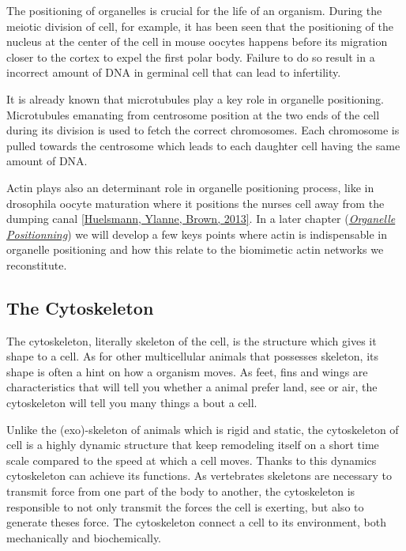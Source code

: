 \documentclass[A4paperpaper,11pt,english]{sphinxmanual}
\begin{document}
The positioning of organelles is crucial for the life of an organism. During the
meiotic division of cell, for example, it has been seen that the positioning of
the nucleus at the center of the cell in mouse oocytes happens before its
migration closer to the cortex to expel the first polar body. Failure to do so
result in a incorrect amount of DNA in germinal cell that can lead to
infertility.

It is already known that microtubules play a key role in organelle positioning.
Microtubules emanating from centrosome position at the two ends of the cell
during its division is used to fetch the correct chromosomes. Each
chromosome is pulled towards the centrosome which leads to each daughter
cell having the same amount of DNA.

Actin plays also an determinant role in organelle positioning process,
like in drosophila oocyte maturation where it positions the nurses cell away
from the dumping canal {\hyperref[parts/part1:huelsmann2013]{{[}Huelsmann, Ylanne, Brown,  2013{]}}}. In a later chapter ({\hyperref[parts/part1:organelle-positioning]{\emph{Organelle
Positionning}}}) we will develop a few keys points where
actin is indispensable in organelle positioning and how this relate to the
biomimetic actin networks we reconstitute.


\subsection{The Cytoskeleton}
\label{parts/part1:intro-cyto}\label{parts/part1:the-cytoskeleton}
The cytoskeleton, literally skeleton of the cell, is the structure which gives
it shape to a cell.  As for other multicellular animals that possesses
skeleton, its shape is often a hint on how a organism moves. As feet, fins and
wings are characteristics that will tell you whether a animal
prefer land, see or air, the cytoskeleton will tell you many
things a bout a cell.

Unlike the (exo)-skeleton of animals which is rigid and
static, the cytoskeleton of cell is a  highly dynamic structure that keep
remodeling itself on a short time scale compared to the speed at which a cell
moves. Thanks to this dynamics cytoskeleton can achieve its
functions.  As vertebrates skeletons are necessary to transmit force from one part
of the body to another, the cytoskeleton is responsible to not only
transmit the forces the cell is exerting, but also to generate theses force.
The cytoskeleton connect a cell to its environment,
both mechanically and biochemically.
\end{document}
